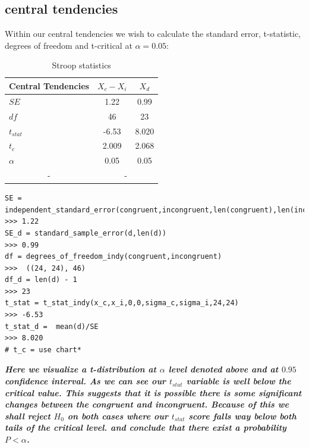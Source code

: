 \documentclass[8pt]{article}
\newcommand{\8}{\bar}
\begin{document}
\subsection{central tendencies} 
Within our central tendencies we wish to calculate the standard error, t-statistic, degrees of freedom and t-critical at $\alpha = 0.05$: 
\begin{table}[htbp]\centering \caption{Stroop statistics \label{sumstat}}
\begin{tabular}{l c c  }\hline\hline
\multicolumn{1}{c}{\textbf{Central Tendencies}} & $X_{c} - X_{i}$ & $X_{d}$ \\ \hline
$SE$ & 1.22 & 0.99\\
$df$  & 46 & 23\\
$t_{stat}$ & -6.53 & 8.020 \\ 
$t_{c}$ &  2.009 &  2.068\\ 
$\alpha$ & 0.05 & 0.05\\
\multicolumn{1}{c}{-} & \multicolumn{2}{c}{-}\\ \hline
\end{tabular}
\end{table}
\begin{verbatim}
SE = independent_standard_error(congruent,incongruent,len(congruent),len(incongruent)) 
>>> 1.22 
SE_d = standard_sample_error(d,len(d)) 
>>> 0.99
df = degrees_of_freedom_indy(congruent,incongruent) 
>>>  ((24, 24), 46)
df_d = len(d) - 1 
>>> 23 
t_stat = t_stat_indy(x_c,x_i,0,0,sigma_c,sigma_i,24,24)
>>> -6.53 
t_stat_d =  mean(d)/SE 
>>> 8.020 
# t_c = use chart* 
\end{verbatim}
\textbf{\textit{Here we visualize a t-distribution at $\alpha$ level denoted above and at $0.95$ confidence interval. As we can see our $t_{stat}$ variable is well below the critical value. This suggests that it is possible there is some significant changes between the \textit{congruent} and \textit{incongruent}. Because of this we shall reject $H_{0}$ on both cases where our $t_{stat}$ score falls way below both tails of the critical level. and conclude that there exist a probability $P < \alpha$.}}\newline\newline 
\end{document}

